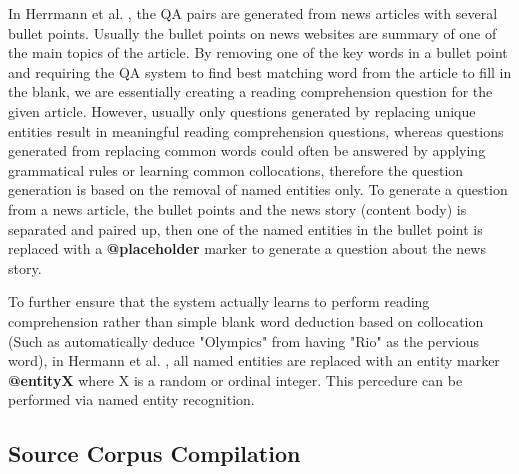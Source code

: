 \documentclass[]{article}
\begin{document}
In Herrmann et al. \cite{hermann2015teaching}, the QA pairs are generated from news articles with several bullet points. Usually the bullet points on news websites are summary of one of the main topics of the article. By removing one of the key words in a bullet point and requiring the QA system to find best matching word from the article to fill in the blank, we are essentially creating a reading comprehension question for the given article. However, usually only questions generated by replacing unique entities result in meaningful reading comprehension questions, whereas questions generated from replacing common words could often be answered by applying grammatical rules or learning common collocations, therefore the question generation is based on the removal of named entities only. To generate a question from a news article, the bullet points and the news story (content body) is separated and paired up, then one of the named entities in the bullet point is replaced with a \textbf{@placeholder} marker to generate a question about the news story.

To further ensure that the system actually learns to perform reading comprehension rather than simple blank word deduction based on collocation (Such as automatically deduce "Olympics" from having "Rio" as the pervious word), in Hermann et al. \cite{hermann2015teaching}, all named entities are replaced with an entity marker \textbf{@entityX} where X is a random or ordinal integer. This percedure can be performed via named entity recognition.

\subsection{Source Corpus Compilation}
\end{document}
